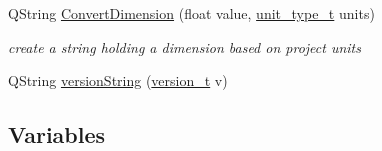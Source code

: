 \begin{DoxyCompactItemize}
Q\+String \hyperlink{namespaceShipCAD_ac24d97adcdf1709fc8e857f5d07395ff}{Convert\+Dimension} (float value, \hyperlink{namespaceShipCAD_ac6a7a28b4b063771afae92decb602da5}{unit\+\_\+type\+\_\+t} units)
\begin{DoxyCompactList}\small\item\em create a string holding a dimension based on project units \end{DoxyCompactList}\item 
Q\+String \hyperlink{namespaceShipCAD_a2901c6bb3e9ddd7efa9bdcc9095cc468}{version\+String} (\hyperlink{namespaceShipCAD_af3a6fa23a7318acbda7b0066b53d694f}{version\+\_\+t} v)
\end{DoxyCompactItemize}
\subsection*{Variables}

